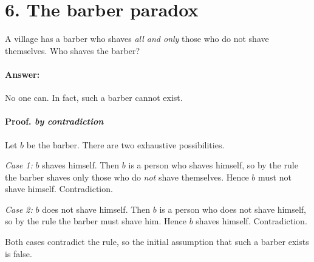 \section*{6. The barber paradox}

A village has a barber who shaves \emph{all and only} those who do not shave themselves.
Who shaves the barber?

\paragraph{Answer:} No one can. In fact, such a barber cannot exist.

\paragraph{Proof. \textit{by contradiction}}
Let $b$ be the barber. There are two exhaustive possibilities.

\emph{Case 1:} $b$ shaves himself. Then $b$ is a person who shaves himself, so by the rule
the barber shaves only those who do \emph{not} shave themselves. Hence $b$ must not shave himself.
Contradiction.

\emph{Case 2:} $b$ does not shave himself. Then $b$ is a person who does not shave himself, so
by the rule the barber must shave him. Hence $b$ shaves himself.
Contradiction.

Both cases contradict the rule, so the initial assumption that such a barber exists is false.
